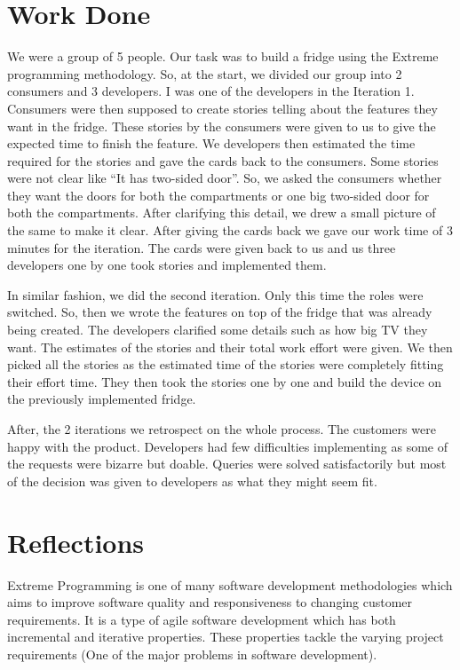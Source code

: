 \section{Work Done}

We were a group of 5 people. Our task was to build a fridge using the Extreme programming methodology. So, at the start, we divided our group into 2 consumers and 3 developers. I was one of the developers in the Iteration 1. Consumers were then supposed to create stories telling about the features they want in the fridge. These stories by the consumers were given to us to give the expected time to finish the feature. We developers then estimated the time required for the stories and gave the cards back to the consumers. Some stories were not clear like ``It has two-sided door''. So, we asked the consumers whether they want the doors for both the compartments or one big two-sided door for both the compartments. After clarifying this detail, we drew a small picture of the same to make it clear. After giving the cards back we gave our work time of 3 minutes for the iteration. The cards were given back to us and us three developers one by one took stories and implemented them.

In similar fashion, we did the second iteration. Only this time the roles were switched. So, then we wrote the features on top of the fridge that was already being created. The developers clarified some details such as how big TV they want. The estimates of the stories and their total work effort were given. We then picked all the stories as the estimated time of the stories were completely fitting their effort time. They then took the stories one by one and build the device on the previously implemented fridge.

After, the 2 iterations we retrospect on the whole process. The customers were happy with the product. Developers had few difficulties implementing as some of the requests were bizarre but doable. Queries were solved satisfactorily but most of the decision was given to developers as what they might seem fit.

\section{Reflections}

Extreme Programming is one of many software development methodologies which aims to improve software quality and responsiveness to changing customer requirements. It is a type of agile software development which has both incremental and iterative properties. These properties tackle the varying project requirements (One of the major problems in software development).

